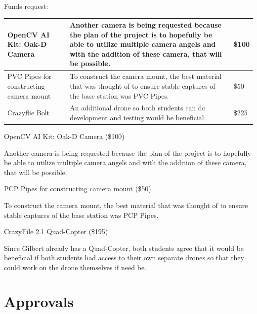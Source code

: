 \documentclass[12pt,onecolumn]{IEEEtran}			%
\begin{document}
\vspace{12pt} 

Funds request:

\begin{center}
\begin{tabular}{| m{3cm} | m{13.5cm}| m{1cm} |} 
 \hline
 OpenCV AI Kit: Oak-D Camera & Another camera is being requested because the plan of the project is to hopefully be able to utilize multiple camera angels and with the addition of these camera, that will be possible.  & \$100 \\
 \hline
 PVC Pipes for constructing camera mount & To construct the camera mount, the best material that was thought of to ensure stable captures of the base station was PVC Pipes. & \$50 \\
 \hline
 Crazyflie Bolt & An additional drone so both students can do development and testing would be beneficial. & \$225 \\
 \hline
\end{tabular}
\end{center}

 \begin{description}
  \item[$\bullet$ ] OpenCV AI Kit: Oak-D Camera (\$100)
  \item Another camera is being requested because the plan of the project is to hopefully be able to utilize multiple camera angels and with the addition of these camera, that will be possible. 
  \vspace{12pt} 
  \item[$\bullet$ ] PCP Pipes for constructing camera mount (\$50)
  \item To construct the camera mount, the best material that was thought of to ensure stable captures of the base station was PCP Pipes. 
  \vspace{12pt} 
  \item[$\bullet$ ] CrazyFile 2.1 Quad-Copter (\$195)
  \item Since Gilbert already has a Quad-Copter, both students agree that it would be beneficial if both students had access to their own separate drones so that they could work on the drone themselves if need be. 
  
\end{description}

 
 \section{Approvals}
\vspace{12pt} 
\vspace{12pt} 
\end{document}
